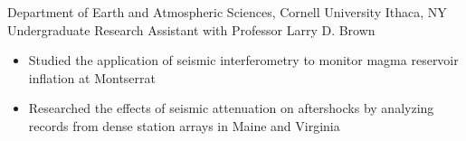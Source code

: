 
        {Department of Earth and Atmospheric Sciences, Cornell University}
        {Ithaca, NY}
        {Undergraduate Research Assistant}
        {with Professor Larry D. Brown}{
    \begin{itemize}
        \item Studied the application of seismic interferometry to monitor magma reservoir
            inflation at Montserrat
        \item Researched the effects of seismic attenuation on aftershocks by analyzing records
            from dense station arrays in Maine and Virginia
    \end{itemize}
}
